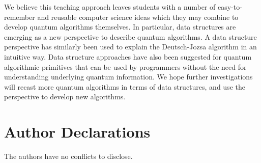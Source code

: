 \documentclass[prb,preprint]{revtex4}
\begin{document}
	We believe this teaching approach leaves students with a number of easy-to-remember and reusable computer science ideas which they may combine to develop quantum algorithms themselves. In particular, data structures are emerging as a new perspective to describe quantum algorithms. A data structure perspective has similarly been used to explain the Deutsch-Jozsa algorithm \cite{firstimpression_dj} in an intuitive way. Data structure approaches have also been suggested for quantum algorithmic primitives \cite{kallaugher2025design,zhao2016fast} that can be used by programmers without the need for understanding underlying quantum information. We hope further investigations will recast more quantum algorithms in terms of data structures, and use the perspective to develop new algorithms. 

	\section*{Author Declarations}
	The authors have no conflicts to disclose.

	
	
	

	
\end{document}
